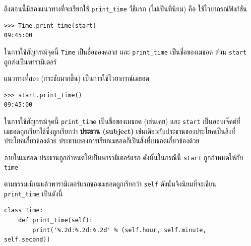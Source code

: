 ถึงตอนนี้มีสองแนวทางที่จะเรียกใช้ \verb|print_time| วีธีแรก (ไม่เป็นที่นิยม) คือ ใช้ไวยากรณ์ฟังก์ชัน

\begin{verbatim}
>>> Time.print_time(start)
09:45:00
\end{verbatim}
%

ในการใช้สัญกรณ์จุดนี้ {\tt Time} เป็นชื่อของคลาส และ \verb|print_time| เป็นชื่อของเมธอด  ส่วน {\tt start} ถูกส่งเป็นพารามิเตอร์


แนวทางที่สอง (กระชับมากขึ้น)  เป็นการใช้ไวยากรณ์เมธอด

\begin{verbatim}
>>> start.print_time()
09:45:00
\end{verbatim}
%

ในการใช้สัญกรณ์จุดนี้ \verb|print_time| เป็นชื่อของเมธอด (เช่นเคย) และ {\tt start} 
เป็นออบเจ๊คต์ที่เมธอดถูกเรียกใช้ซึ่งถูกเรียกว่า {\bf ประธาน (subject)} เช่นเดียวกับประธานของประโยคเป็นสิ่งที่ประโยคเกี่ยวข้องด้วย 
ประธานของการเรียกเมธอดก็เป็นสิ่งที่เมธอดเกี่ยวข้องด้วย


ภายในเมธอด ประธานถูกกำหนดให้เป็นพารามิเตอร์แรก ดังนั้นในกรณีนี้ {\tt start} ถูกกำหนดให้กับ {\tt time}


ตามธรรมเนียมแล้วพารามิเตอร์แรกของเมธอดถูกเรียกว่า {\tt self} ดังนั้นจึงนิยมที่จะเขียน \verb|print_time| เป็นดังนี้

\begin{verbatim}
class Time:
    def print_time(self):
        print('%.2d:%.2d:%.2d' % (self.hour, self.minute, self.second))
\end{verbatim}
%

